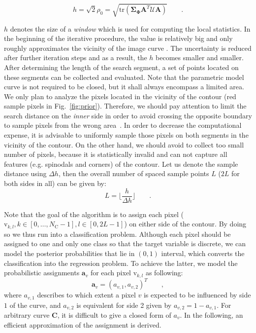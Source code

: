 \documentclass[conference]{IEEEtran}
\begin{document}
\begin{equation}
  \label{eq:radius}
  h = \sqrt{2} \rho_0 = \sqrt{\mathrm{tr}(\mathbf{\Sigma}_{\mathbf{\Phi}}\mathbf{A}^T\mathcal{U}\mathbf{A})}\qquad.
\end{equation}

$h$ denotes the size of a \textit{window} which is used for computing
the local statistics. In the beginning of the iterative procedure, the value
is relatively big and only roughly approximates the vicinity of the image curve
. The
uncertainty is reduced after further iteration steps and as a result, the $h$ becomes smaller and
smaller. After determining the length of the search segment, 
a set of points located on these segments can be collected and
evaluated. Note that the parametric model curve is not required to be
closed, but it shall always encompass a limited area. We only plan to
analyze the pixels located in the vicinity of the contour (red sample
pixels in Fig.~\ref{fig:prior}). Therefore,
we should pay attention to limit the search distance on the
\textit{inner} side in order to avoid crossing the opposite
boundary to sample pixels from the wrong area~\cite{panin2006fully}. In order to
decrease the computational expense, it is advisable to uniformly sample those
pixels on both segments in the vicinity of the contour. On the other
hand, we should avoid to collect too small number of pixels, because
it is statistically invalid and can not
capture all features (e.g. spinodals and corners) of the contour. Let us denote the
sample distance using $\Delta h$, then the overall number of spaced
sample points $L$ ($2L$ for both sides in all) can be given by:
\begin{equation}
  \label{eq:sample}
  L = \lfloor \frac{h}{\Delta h} \rfloor\qquad.
\end{equation}

Note that the goal of the algorithm is to assign each pixel
($\mathrm{v}_{k,l}, k \in [0,\ldots,N_{\mathrm{C}}-1], l \in [0,
2L-1]$) on either side of the contour. By doing so we thus run into a
classification problem.
Although each pixel should be assigned to one and only
one class so that the target variable is discrete, we can model the
posterior probabilities that lie in $(0,1)$ interval, which converts the classification into the regression problem. To achieve the latter, we model the probabilistic
assignments $\mathbf{a}_{v}$ for each pixel $\mathrm{v}_{k,l}$ as following:
\begin{equation}
  \label{eq:pa}
  \mathbf{a}_v  = (a_{v,1}, a_{v,2})^T\qquad,
\end{equation}
where $a_{v,1}$ describes to which extent a pixel $v$ is expected to
be influenced by side $1$ of the curve, and $a_{v,2}$ is equivalent
for side 2 given by $a_{v,2} = 1- a_{v,1}$. For arbitrary curve
$\mathbf{C}$, it is difficult to give a closed form of $a_v$. In the
following, an efficient approximation of the assignment is derived.
\end{document}
